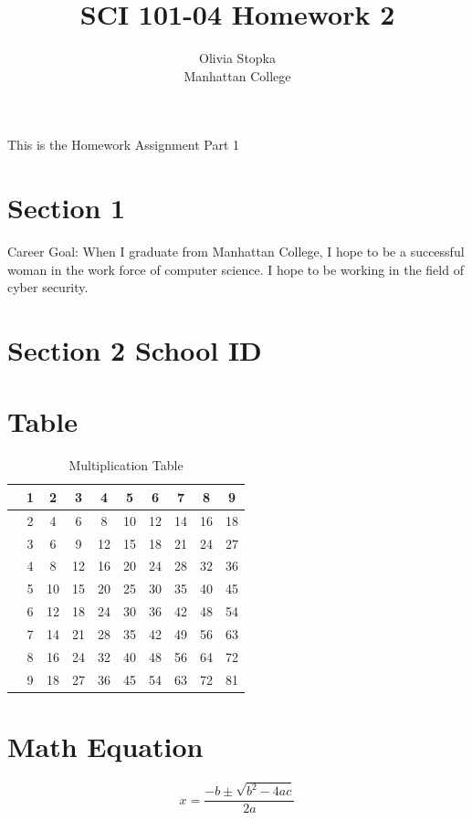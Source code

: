 \documentclass[11pt]{article}
\begin{document}
\title{SCI 101-04 Homework 2}
\author{Olivia Stopka\\
Manhattan College}
\renewcommand{\today}{February 5, 2019}
\maketitle
This is the Homework Assignment Part 1



\section{Section 1}
 Career Goal:
 When I graduate from Manhattan College, I hope to be a successful woman in the work force of computer science. I hope to be working in the field of cyber security. 



\section{Section 2 School ID}
\begin{figure}[!h]
\end{figure}



\section{Table}
\begin{table}[h]
\caption{Multiplication Table}
\centering
\begin{tabular}{ |c|c|c|c|c|c|c|c|c|c|}
\hline
     & 1 & 2 & 3& 4 & 5& 6 & 7& 8 &9 \\
     \hline

          & 2 & 4 & 6& 8 & 10& 12 & 14& 16&18 \\
          \hline

               & 3 & 6 & 9& 12 & 15& 18 & 21& 24 &27 \\
\hline
     & 4 & 8 & 12& 16 & 20& 24 & 28& 32 &36 \\
\hline
     & 5 &10 & 15& 20 & 25& 30 & 35& 40 &45 \\
\hline
     & 6 & 12 & 18& 24 & 30& 36 & 42& 48 &54\\
\hline
 & 7 & 14 & 21& 28 & 35& 42 & 49& 56 &63 \\
\hline
 & 8 & 16 & 24& 32 & 40& 48 & 56& 64 &72 \\
\hline
 & 9 & 18 & 27& 36 & 45& 54 & 63& 72 &81 \\
\hline
 \end{tabular}
\end{table}




\section{ Math Equation}

\[x=\frac{-b\pm \sqrt{b^{2}-4ac}}{2a}\]
\end{document}
